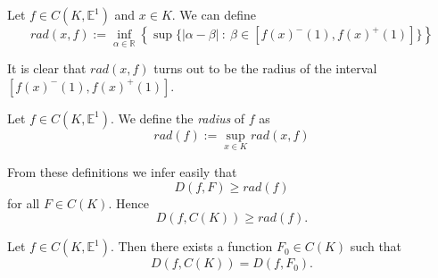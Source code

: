 \documentclass[12pt]{amsart}
\begin{document}
\begin{definition}
Let $f \in C(K,\mathbb{E}^1)$ and $x\in K$. We can define
\[
rad(x,f):=\inf_{\alpha\in \mathbb{R}}\left\{\sup\{ |\alpha-\beta| \ :\ \beta\in [f(x)^-(1),f(x)^+(1)]\}\right\}
\]

It is clear that $rad(x,f)$ turns out to be the radius of the interval $[f(x)^-(1),f(x)^+(1)]$.
\end{definition}




\begin{definition}
Let $f \in C(K,\mathbb{E}^1)$. We define the {\em radius} of $f$ as
\[
rad(f):=\sup_{x\in K}rad(x,f)
\]
\end{definition}


\begin{remark}
From these definitions we infer easily that
\[D(f,F) \ge rad(f)\]
for all $F\in C(K)$. Hence
\[D(f,C(K)) \ge rad(f).\]
\end{remark}


%


\begin{theorem} Let $f \in C(K,\mathbb{E}^1)$. Then there exists a function $F_0\in C(K)$ such that
\[D(f,C(K))=D(f,F_0).\]
\end{theorem}
\end{document}
